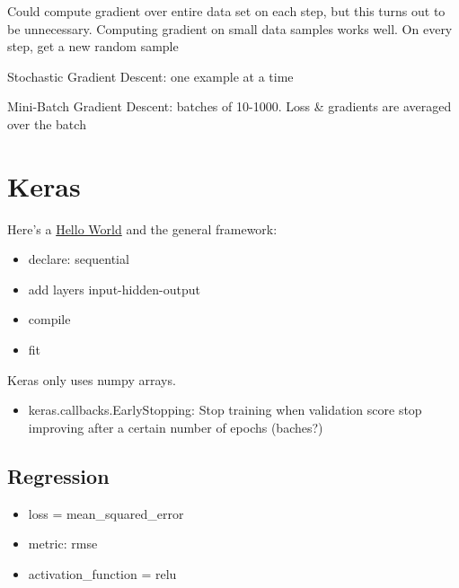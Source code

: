 \documentclass[]{book}
\providecommand{\tightlist}{%
  \setlength{\itemsep}{0pt}\setlength{\parskip}{0pt}}
\theoremstyle{definition}
\theoremstyle{definition}
\theoremstyle{definition}
\theoremstyle{remark}
\begin{document}
Could compute gradient over entire data set on each step, but this turns
out to be unnecessary. Computing gradient on small data samples works
well. On every step, get a new random sample

Stochastic Gradient Descent: one example at a time

Mini-Batch Gradient Descent: batches of 10-1000. Loss \& gradients are
averaged over the batch

\section{Keras}\label{keras}

Here's a
\href{https://github.com/fastforwardlabs/keras-hello-world/blob/master/kerashelloworld.ipynb}{Hello
World} and the general framework:

\begin{itemize}
\item
  declare: sequential
\item
  add layers input-hidden-output
\item
  compile
\item
  fit
\end{itemize}

Keras only uses numpy arrays.

\begin{itemize}
\tightlist
\item
  keras.callbacks.EarlyStopping: Stop training when validation score
  stop improving after a certain number of epochs (baches?)
\end{itemize}

\subsection{Regression}\label{regression}

\begin{itemize}
\item
  loss = mean\_squared\_error
\item
  metric: rmse
\item
  activation\_function = relu
\end{itemize}
\end{document}
